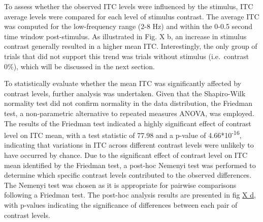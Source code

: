 \documentclass[
  letterpaper,
  DIV=11,
  numbers=noendperiod]{scrartcl}
\begin{document}
To assess whether the observed ITC levels were influenced by the
stimulus, ITC average levels were compared for each level of stimulus
contrast. The average ITC was computed for the low-frequency range (2-8
Hz) and within the 0-0.5 second time window post-stimulus. As
illustrated in Fig. X b, an increase in stimulus contrast generally
resulted in a higher mean ITC. Interestingly, the only group of trials
that did not support this trend was trials without stimulus
(i.e.~contrast 0\%), which will be discussed in the next section.

To statistically evaluate whether the mean ITC was significantly
affected by contrast levels, further analysis was undertaken. Given that
the Shapiro-Wilk normality test did not confirm normality in the data
distribution, the Friedman test, a non-parametric alternative to
repeated measures ANOVA, was employed. The results of the Friedman test
indicated a highly significant effect of contrast level on ITC mean,
with a test statistic of 77.98 and a p-value of
4.66*10\textsuperscript{-16}, indicating that variations in ITC across
different contrast levels were unlikely to have occurred by chance. Due
to the significant effect of contrast level on ITC mean identified by
the Friedman test, a post-hoc Nemenyi test was performed to determine
which specific contrast levels contributed to the observed differences.
The Nemenyi test was chosen as it is appropriate for pairwise
comparisons following a Friedman test. The post-hoc analysis results are
presented in fig \ul{X d,} with p-values indicating the significance of
differences between each pair of contrast levels.
\end{document}
